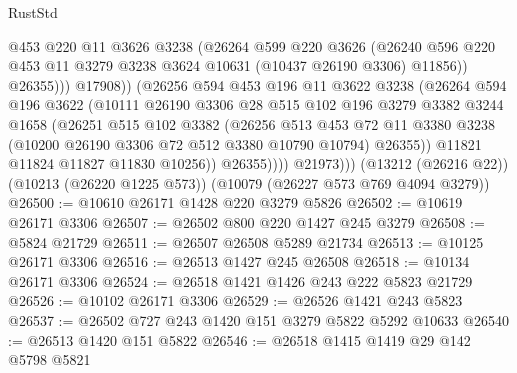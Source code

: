 \begin{lexlean}{RustStd}
\begin{coremodule}
                          @453
                          @220
                          @11
                          @3626
                          @3238
                          (@26264
                            @599
                            @220
                            @3626
                            (@26240
                              @596
                              @220
                              @453
                              @11
                              @3279
                              @3238
                              @3624
                              @10631
                              (@10437 @26190 @3306)
                              @11856))
                          @26355)))
                    @17908))
                (@26256
                  @594
                  @453
                  @196
                  @11
                  @3622
                  @3238
                  (@26264
                    @594
                    @196
                    @3622
                    (@10111
                      @26190
                      @3306
                      @28
                      @515
                      @102
                      @196
                      @3279
                      @3382
                      @3244
                      @1658
                      (@26251
                        @515
                        @102
                        @3382
                        (@26256
                          @513
                          @453
                          @72
                          @11
                          @3380
                          @3238
                          (@10200 @26190 @3306 @72 @512 @3380 @10790 @10794)
                          @26355))
                      @11821
                      @11824
                      @11827
                      @11830
                      @10256))
                  @26355))))
          @21973)))
    (@13212 (@26216 @22))
    (@10213 (@26220 @1225 @573))
    (@10079 (@26227 @573 @769 @4094 @3279))
@26500 := @10610 @26171 @1428 @220 @3279 @5826
@26502 := @10619 @26171 @3306
@26507 := @26502 @800 @220 @1427 @245 @3279
@26508 := @5824 @21729
@26511 := @26507 @26508 @5289 @21734
@26513 := @10125 @26171 @3306
@26516 := @26513 @1427 @245 @26508
@26518 := @10134 @26171 @3306
@26524 := @26518 @1421 @1426 @243 @222 @5823 @21729
@26526 := @10102 @26171 @3306
@26529 := @26526 @1421 @243 @5823
@26537 := @26502 @727 @243 @1420 @151 @3279 @5822 @5292 @10633
@26540 := @26513 @1420 @151 @5822
@26546 := @26518 @1415 @1419 @29 @142 @5798 @5821

\end{coremodule}
\end{lexlean}
